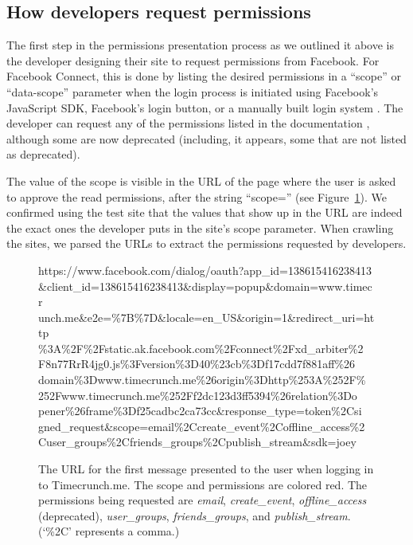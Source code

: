 \documentclass[10pt]{sig-alternate-10pt}
\begin{document}
\subsection{How developers request permissions}

The first step in the permissions presentation process as we outlined it above is the developer designing their site to request permissions from Facebook. For Facebook Connect, this is done by listing the desired permissions in a ``scope'' or ``data-scope'' parameter when the login process is initiated using Facebook's JavaScript SDK, Facebook's login button, or a manually built login system \cite{fbpermsinstructions}. The developer can request any of the permissions listed in the documentation \cite{fbpermissions}, although some are now deprecated (including, it appears, some that are not listed as deprecated).

The value of the scope is visible in the URL of the page where the user is asked to approve the read permissions, after the string ``scope='' (see Figure~\ref{figure:scopeinurl}). We confirmed using the test site that the values that show up in the URL are indeed the exact ones the developer puts in the site's scope parameter. When crawling the sites, we parsed the URLs to extract the permissions requested by developers.

\begin{figure}[h!]
  {\small{\selectfont https://www.facebook.com/dialog/oauth?app\_id=138615416238413\\\&client\_id=138615416238413\&display=popup\&domain=www.timecr\\unch.me\&e2e=\%7B\%7D\&locale=en\_US\&origin=1\&redirect\_uri=http\\\%3A\%2F\%2Fstatic.ak.facebook.com\%2Fconnect\%2Fxd\_arbiter\%2\\F8n77RrR4jg0.js\%3Fversion\%3D40\%23cb\%3Df17cdd7f881aff\%26\\domain\%3Dwww.timecrunch.me\%26origin\%3Dhttp\%253A\%252F\%\\252Fwww.timecrunch.me\%252Ff2dc123d3ff5394\%26relation\%3Do\\pener\%26frame\%3Df25cadbc2ca73cc\&response\_type=token\%2Csi\\gned\_request\&{\color{darkred}scope=email\%2Ccreate\_event\%2Coffline\_access\%2\\Cuser\_groups\%2Cfriends\_groups\%2Cpublish\_stream}\&sdk=joey}}
  \caption{The URL for the first message presented to the user when logging in to Timecrunch.me. The scope and permissions are colored red. The permissions being requested are \emph{email}, \emph{create\_event}, \emph{offline\_access} (deprecated), \emph{user\_groups}, \emph{friends\_groups}, and \emph{publish\_stream}. (`\%2C' represents a comma.)}
  \label{figure:scopeinurl}
\end{figure}
\end{document}
